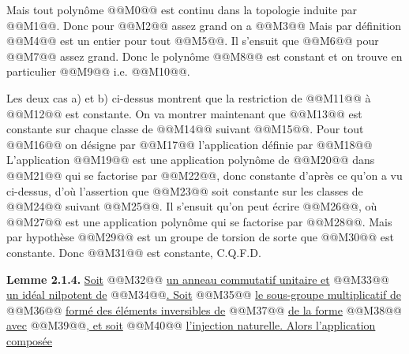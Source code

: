 
Mais tout polynôme @@M0@@ est continu dans la topologie induite par @@M1@@. Donc pour @@M2@@ assez grand on a
@@M3@@
Mais par définition @@M4@@ est un entier pour tout @@M5@@. Il s'ensuit que @@M6@@ pour @@M7@@ assez grand. Donc le polynôme @@M8@@ est constant et on trouve en particulier @@M9@@ i.e. @@M10@@.

Les deux cas a) et b) ci-dessus montrent que la restriction de @@M11@@ à @@M12@@ est constante. On va montrer maintenant que @@M13@@ est constante sur chaque classe de @@M14@@ suivant @@M15@@. Pour tout @@M16@@ on désigne par @@M17@@ l'application définie par
@@M18@@
L'application @@M19@@ est une application polynôme de @@M20@@ dans @@M21@@ qui se factorise par @@M22@@, donc constante d'après ce qu'on a vu ci-dessus, d'où l'assertion que @@M23@@ soit constante sur les classes de @@M24@@ suivant @@M25@@. Il s'ensuit qu'on peut écrire @@M26@@, où @@M27@@ est une application polynôme qui se factorise par @@M28@@. Mais par hypothèse @@M29@@ est un groupe de torsion de sorte que @@M30@@ est constante. Donc @@M31@@ est constante, C.Q.F.D.

\textbf{Lemme 2.1.4.} \uline{Soit} @@M32@@ \uline{un anneau commutatif unitaire et} @@M33@@ \uline{un idéal nilpotent de} @@M34@@\uline{. Soit} @@M35@@ \uline{le sous-groupe multiplicatif de} @@M36@@ \uline{formé des éléments inversibles de} @@M37@@ \uline{de la forme} @@M38@@ \uline{avec} @@M39@@\uline{, et soit} @@M40@@ \uline{l'injection naturelle. Alors l'application composée}
